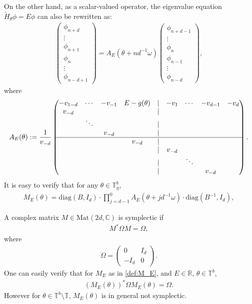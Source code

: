 \documentclass[11pt]{amsart}
\newcommand{\R}{\mathbb R}
\newcommand{\C}{\mathbb C}
\newcommand{\T}{\mathbb T}
\begin{document}
On the other hand, as a scalar-valued operator, the eigenvalue equation $\tilde{H}_{\theta}\phi=E\phi$ can also be rewritten as:
\begin{align}\label{eq:tranfer_hH_varepsilon_1step}
\left(\begin{matrix}
\phi_{n+d}\\
\vdots\\
\phi_{n+1}\\
\phi_n\\
\vdots\\
\phi_{n-d+1}
\end{matrix}\right)
=A_{E}(\theta+nd^{-1}\omega)
\left(\begin{matrix}
\phi_{n+d-1}\\
\vdots\\
\phi_{n}\\
\phi_{n-1}\\
\vdots\\
\phi_{n-d}\end{matrix}\right),
\end{align}
where 
\begin{equation}\label{def:A_E}
A_{E}(\theta):=
\frac{1}{v_{-d}}
\left(\begin{matrix}
-v_{1-d} &\cdots &-v_{-1} &E-g(\theta) &| &-v_1 &\cdots &-v_{d-1} &-v_d\\
v_{-d} & & & &|\\
&\ddots & & &| & \\
& &v_{-d}  & &| &\\
\hline
& & &v_{-d} &| &\\
& & & &| &v_{-d} \\
& & & &| & &\ddots\\
& & & &| & & &v_{-d}
\end{matrix}\right).
\end{equation}
It is easy to verify that for any $\theta\in \T^b_{\eta}$,
\begin{align}\label{eq:matrix_M=A}
    M_E(\theta)=\mathrm{diag}(B,I_d)\cdot \prod_{j=d-1}^0 A_E(\theta+jd^{-1}\omega)\cdot \mathrm{diag}(B^{-1},I_d),
\end{align}

A complex matrix $M\in \mathrm{Mat}(2d,\C)$ is symplectic if 
\begin{align}\label{def:symp}
    M^*\Omega M=\Omega,
\end{align}
where 
\begin{align}
    \Omega=\left(\begin{matrix} 0 & I_d\\ -I_d &0\end{matrix}\right).
\end{align}
One can easily verify that for $M_E$ as in \eqref{def:M_E}, and $E\in \R$, $\theta\in \T^b$,
\begin{align}
    (M_E(\theta))^* \Omega M_E(\theta)=\Omega.
\end{align}
However for $\theta\in \T^b\setminus \T$, $M_E(\theta)$ is in general not symplectic.
\end{document}
